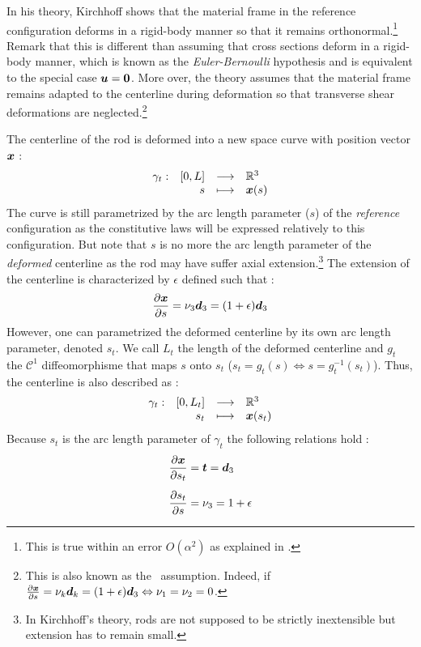 In his theory, Kirchhoff shows that the material frame in the reference configuration deforms in a rigid-body manner so that it remains orthonormal.\footnote{This is true within an error $O(\alpha^2)$ as explained in \cite[]{Coleman1993}.} Remark that this is different than assuming that cross sections deform in a rigid-body manner, which is known as the \emph{Euler-Bernoulli} hypothesis and is equivalent to the special case $\boldsymbol{u} = \boldsymbol{0}$. More over, the theory assumes that the material frame remains adapted to the centerline during deformation so that transverse shear deformations are neglected.\footnote{This is also known as the  assumption. Indeed, if $\frac{\partial \boldsymbol{x}}{\partial s} = \nu_k \boldsymbol{d}_k = (1 + \epsilon)\boldsymbol{d}_3 \Leftrightarrow \nu_1 = \nu_2 = 0$.}

The centerline of the rod is deformed into a new space curve with position vector $\boldsymbol{x}$ : 
\begin{equation}
	\begin{array}{lrcl} \gamma_t: & [0,{L}] & \longrightarrow & \mathbb{R}^3 \\ & s & \longmapsto & \boldsymbol{x}(s) \end{array}
\end{equation}
The curve is still parametrized by the arc length parameter ($s$) of the \emph{reference} configuration as the constitutive laws will be expressed relatively to this configuration. But note that $s$ is no more the arc length parameter of the \emph{deformed} centerline as the rod may have suffer axial extension.\footnote{In Kirchhoff's theory, rods are not supposed to be strictly inextensible but extension has to remain small.} The extension of the centerline is characterized by $\epsilon$ defined such that :
 \begin{equation}
	\frac{\partial \boldsymbol{x}}{\partial s} = \nu_3 \boldsymbol{d}_3 =  (1 + \epsilon) \boldsymbol{d}_3
\end{equation}
However, one can parametrized the deformed centerline by its own arc length parameter, denoted $s_t$. We call $L_t$ the length of the deformed centerline and $g_t$ the $\mathcal{C}^1$ diffeomorphisme that maps $s$ onto $s_t$ ($s_t = g_t(s) \Leftrightarrow s = g_t^{-1}(s_t)$). Thus, the centerline is also described as :
\begin{equation}
	\begin{array}{lrcl} \gamma_t: & [0,{L_t}] & \longrightarrow & \mathbb{R}^3 \\ & s_t & \longmapsto & \boldsymbol{x}(s_t) \end{array}
\end{equation}
Because $s_t$ is the arc length parameter of $\gamma_t$ the following relations hold :
\begin{subequations}
	\begin{align}
		&\frac{\partial \boldsymbol{x}}{\partial s_t} = \boldsymbol{t} = \boldsymbol{d}_3
		\\[0.5em]
		&\frac{\partial s_t}{\partial s} = \nu_3 = 1+ \epsilon
	\end{align}
\end{subequations}

